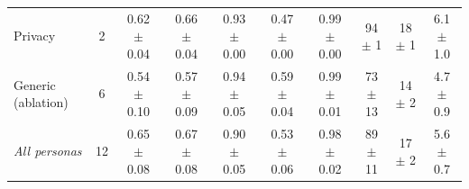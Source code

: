 \begin{table}[t]
\begin{tabular}{lccccccccc}
Privacy & 2 & 0.62 $\pm$ 0.04 & 0.66 $\pm$ 0.04 & 0.93 $\pm$ 0.00 & 0.47 $\pm$ 0.00 & 0.99 $\pm$ 0.00 & 94 $\pm$ 1 & 18 $\pm$ 1 & 6.1 $\pm$ 1.0 \\
Generic (ablation) & 6 & 0.54 $\pm$ 0.10 & 0.57 $\pm$ 0.09 & 0.94 $\pm$ 0.05 & 0.59 $\pm$ 0.04 & 0.99 $\pm$ 0.01 & 73 $\pm$ 13 & 14 $\pm$ 2 & 4.7 $\pm$ 0.9 \\
\midrule
\textit{All personas} & 12 & 0.65 $\pm$ 0.08 & 0.67 $\pm$ 0.08 & 0.90 $\pm$ 0.05 & 0.53 $\pm$ 0.06 & 0.98 $\pm$ 0.02 & 89 $\pm$ 11 & 17 $\pm$ 2 & 5.6 $\pm$ 0.7 \\
\bottomrule
\end{tabular}
\end{table}
